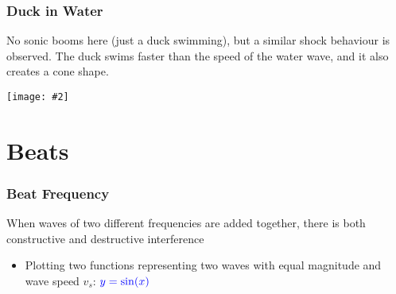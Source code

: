 \documentclass[12pt,aspectratio=169]{beamer}
\newcommand{\pic}[2]{\texttt{[image: \#2]}}
\begin{document}
\begin{frame}
  \frametitle{Duck in Water}
  No sonic booms here (just a duck swimming), but a similar shock behaviour is
  observed. The duck swims faster than the speed of the water wave, and it also
  creates a cone shape.
  \begin{center}
    \pic{.5}{duck.jpg}
  \end{center}
\end{frame}


\section{Beats}

\begin{frame}
  \frametitle{Beat Frequency}
  When waves of two different frequencies are added together, there is both
  constructive and destructive interference
  \begin{itemize}
  \item Plotting two functions representing two waves with equal magnitude
    and wave speed $v_s$: $\color{blue}{y=\sin(x)}$
  \end{itemize}
  \begin{center}
    \vspace{-.1in}
  \end{center}
\end{frame}
\end{document}

